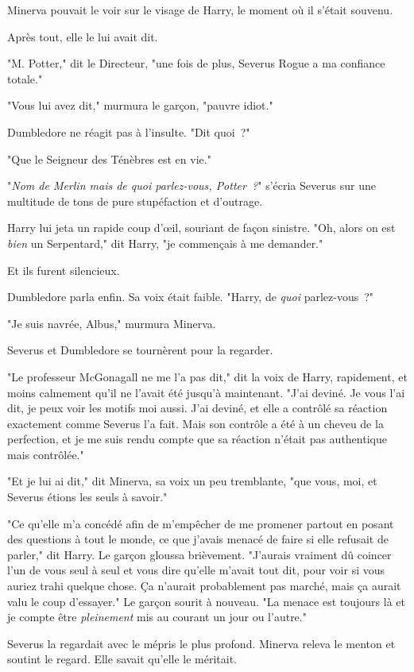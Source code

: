 Minerva pouvait le voir sur le visage de Harry, le moment où il s'était souvenu.

Après tout, elle le lui avait dit.

"M. Potter," dit le Directeur, "une fois de plus, Severus Rogue a ma confiance totale."

"Vous lui avez dit," murmura le garçon, "pauvre idiot."

Dumbledore ne réagit pas à l'insulte. "Dit quoi~?"

"Que le Seigneur des Ténèbres est en vie."

"\emph{Nom de Merlin mais de quoi parlez-vous, Potter~?}" s'écria Severus sur une multitude de tons de pure stupéfaction et d'outrage.

Harry lui jeta un rapide coup d'œil, souriant de façon sinistre. "Oh, alors on est \emph{bien} un Serpentard," dit Harry, "je commençais à me demander."

Et ils furent silencieux.

Dumbledore parla enfin. Sa voix était faible. "Harry, de \emph{quoi} parlez-vous~?"

"Je suis navrée, Albus," murmura Minerva.

Severus et Dumbledore se tournèrent pour la regarder.

"Le professeur McGonagall ne me l'a pas dit," dit la voix de Harry, rapidement, et moins calmement qu'il ne l'avait été jusqu'à maintenant. "J'ai deviné. Je vous l'ai dit, je peux voir les motifs moi aussi. J'ai deviné, et elle a contrôlé sa réaction exactement comme Severus l'a fait. Mais son contrôle a été à un cheveu de la perfection, et je me suis rendu compte que sa réaction n'était pas authentique mais contrôlée."

"Et je lui ai dit," dit Minerva, sa voix un peu tremblante, "que vous, moi, et Severus étions les seuls à savoir."

"Ce qu'elle m'a concédé afin de m'empêcher de me promener partout en posant des questions à tout le monde, ce que j'avais menacé de faire si elle refusait de parler," dit Harry. Le garçon gloussa brièvement. "J'aurais vraiment dû coincer l'un de vous seul à seul et vous dire qu'elle m'avait tout dit, pour voir si vous auriez trahi quelque chose. Ça n'aurait probablement pas marché, mais ça aurait valu le coup d'essayer." Le garçon sourit à nouveau. "La menace est toujours là et je compte être \emph{pleinement} mis au courant un jour ou l'autre."

Severus la regardait avec le mépris le plus profond. Minerva releva le menton et soutint le regard. Elle savait qu'elle le méritait.

